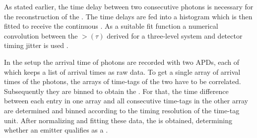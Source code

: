 		As stated earlier, the time delay between two consecutive photons is necessary for the reconstruction of the \gtf.
		The time delays are fed into a histogram which is then fitted to receive the continuous \gtf.
		As a suitable fit function a numerical convolution between the $\gt(\tau)$ derived for a three-level system and detector timing jitter is used \cite{Neu2012b, Neu2012, Riedrich-moller2014}.

		In the \HBT setup the arrival time of photons are recorded with two APDs, each of which keeps a list of arrival times as raw data.
		To get a single array of arrival times of the photons, the arrays of time-tags of the two \APDs have to be correlated. Subsequently they are binned to obtain the \gtf.
		For that, the time difference between each entry in one array and all consecutive time-tags in the other array are determined and binned according to the timing resolution of the time-tag unit.
		After normalizing and fitting these data, the \gtf is obtained, determining whether an emitter qualifies as a \sps.
